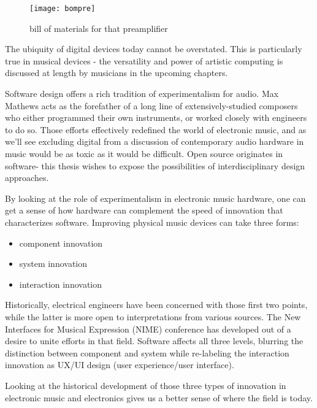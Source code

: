 \begin{figure}[h!]
  \caption{bill of materials for that preamplifier}
  \centering
    \texttt{[image: bompre]}
\end{figure}

The ubiquity of digital devices today cannot be overstated. This is particularly true in musical devices - the versatility and power of artistic computing is discussed at length by musicians in the upcoming chapters. 

Software design offers a rich tradition of experimentalism for audio. Max Mathews acts as the forefather of a long line of extensively-studied composers who either programmed their own instruments, or worked closely with engineers to do so. Those efforts effectively redefined the world of electronic music, and as we'll see excluding digital from a discussion of contemporary audio hardware in music would be as toxic as it would be difficult. Open source originates in software- this thesis wishes to expose the possibilities of interdisciplinary design approaches. 

	By looking at the role of experimentalism in electronic music hardware, one can get a sense of how hardware can complement the speed of innovation that characterizes software. Improving physical music devices can take three forms:  
	
\begin{itemize}
	
\item component innovation

\item system innovation 

\item interaction innovation  

\end{itemize}

Historically, electrical engineers have been concerned with those first two points, while the latter is more open to interpretations from various sources. The New Interfaces for Musical Expression (NIME) conference has developed out of a desire to unite efforts in that field. Software affects all three levels, blurring the distinction between component and system while re-labeling the interaction innovation as UX/UI design (user experience/user interface). 

Looking at the historical development of those three types of innovation in electronic music and electronics gives us a better sense of where the field is today. 

